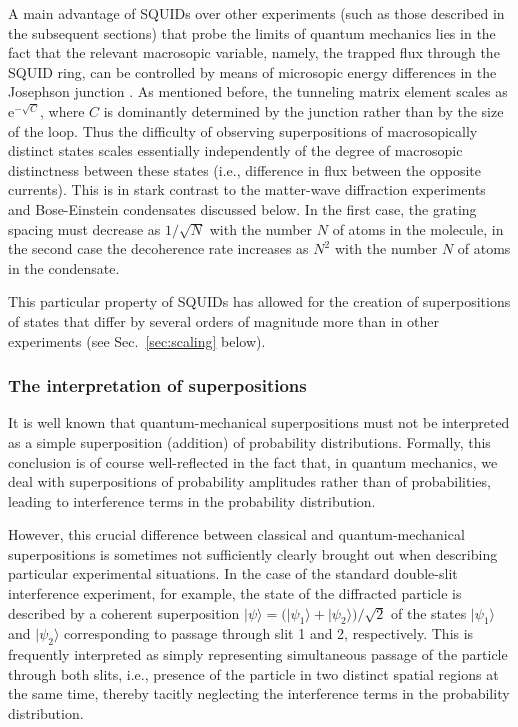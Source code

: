 \documentclass[12pt,aps,floatfix,amsmath,amssymb,showpacs,nofootinbib]{revtex4-2}
\newcommand{\ket}[1]{\ensuremath{|{#1\rangle}}}
\newcommand{\e}{\ensuremath{\mathrm{e}}}
\begin{document}
A main advantage of SQUIDs over other experiments (such as those
described in the subsequent sections) that probe the limits of quantum
mechanics lies in the fact that the relevant macrosopic variable,
namely, the trapped flux through the SQUID ring, can be controlled by
means of microsopic energy differences in the Josephson junction
\cite{Leggett:2002:uy}. As mentioned before, the tunneling matrix
element scales as $\e^{-\sqrt{C}}$, where $C$ is dominantly
determined by the junction rather than by the size of the loop. Thus
the difficulty of observing superpositions of macrosopically distinct
states scales essentially independently of the degree of macrosopic
distinctness between these states (i.e., difference in flux between
the opposite currents). This is in stark contrast to the matter-wave
diffraction experiments and Bose-Einstein condensates discussed below.
In the first case, the grating spacing must decrease as $1/\sqrt{N}$
with the number $N$ of atoms in the molecule, in the second case the
decoherence rate increases as $N^2$ with the number $N$ of atoms in the
condensate.

This particular property of SQUIDs has allowed for the creation of
superpositions of states that differ by several orders of magnitude
more than in other experiments (see Sec.~\ref{sec:scaling} below).


\subsubsection{The interpretation of superpositions}  \label{sec:interpret-superpos}

It is well known that quantum-mechanical superpositions must not be
interpreted as a simple superposition (addition) of probability
distributions.  Formally, this conclusion is of course well-reflected
in the fact that, in quantum mechanics, we deal with superpositions of
probability amplitudes rather than of probabilities, leading to
interference terms in the probability distribution.

However, this crucial difference between classical and
quantum-mechanical superpositions is sometimes not sufficiently
clearly brought out when describing particular experimental
situations. In the case of the standard double-slit interference
experiment, for example, the state of the diffracted particle is
described by a coherent superposition $\ket{\psi} = \bigl(
\ket{\psi_1} + \ket{\psi_2} \bigr) / \sqrt{2}$ of the states
$\ket{\psi_1}$ and $\ket{\psi_2}$ corresponding to passage through
slit 1 and 2, respectively. This is frequently interpreted as simply
representing simultaneous passage of the particle through both slits,
i.e., presence of the particle in two distinct spatial regions at the
same time, thereby tacitly neglecting the interference terms in the
probability distribution.
\end{document}
